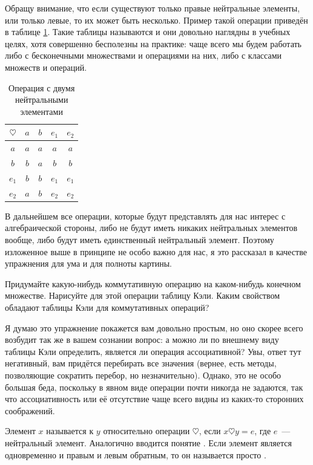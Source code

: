 Обращу внимание, что если существуют только правые нейтральные элементы, или только левые, то их может быть несколько. Пример такой операции приведён в таблице \ref{tb:alg_2neutr}. Такие таблицы называются  и они довольно наглядны в учебных целях, хотя совершенно бесполезны на практике: чаще всего мы будем работать либо с бесконечными множествами и операциями на них, либо с классами множеств и операций.

\begin{table}[h]\label{tb:alg_2neutr}
\centering
\begin{tabular}{c|cccc}
$\heartsuit$ & $a$ & $b$ & $e_1$ & $e_2$ \\
\hline
$a$ & $a$ & $a$ & $a$ & $a$ \\
$b$ & $b$ & $a$ & $b$ & $b$ \\
$e_1$ & $b$ & $b$ & $e_1$ & $e_1$ \\
$e_2$ & $a$ & $b$ & $e_2$ & $e_2$
\end{tabular}
\caption{Операция с двумя нейтральными элементами}
\end{table}

В дальнейшем все операции, которые будут представлять для нас интерес с алгебраической стороны, либо не будут иметь никаких нейтральных элементов вообще, либо будут иметь единственный нейтральный элемент. Поэтому изложенное выше в принципе не особо важно для нас, я это рассказал в качестве упражнения для ума и для полноты картины.

\begin{exercise}
Придумайте какую-нибудь коммутативную операцию на каком-нибудь конечном множестве. Нарисуйте для этой операции таблицу Кэли. Каким свойством обладают таблицы Кэли для коммутативных операций?
\end{exercise}

Я думаю это упражнение покажется вам довольно простым, но оно скорее всего возбудит так же в вашем сознании вопрос: а можно ли по внешнему виду таблицы Кэли определить, является ли операция ассоциативной? Увы, ответ тут негативный, вам придётся перебирать все значения (вернее, есть методы, позволяющие сократить перебор, но незначительно). Однако, это не особо большая беда, поскольку в явном виде операции почти никогда не задаются, так что ассоциативность или её отсутствие чаще всего видны из каких-то сторонних соображений.

\begin{definition}
Элемент $x$ называется  к $y$ относительно операции $\heartsuit$, если
$x\heartsuit y = e$, 
где $e$~— нейтральный элемент. Аналогично вводится понятие . Если элемент является одновременно и правым и левым обратным, то он называется просто .
\end{definition}

